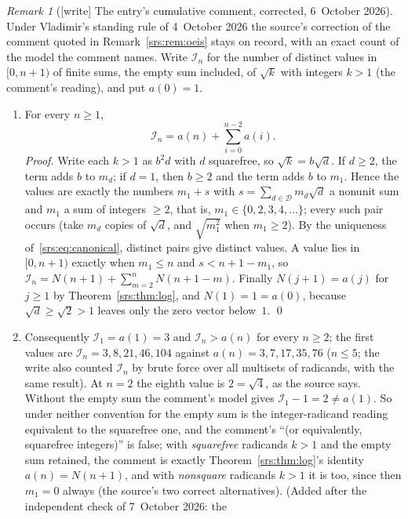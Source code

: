 \documentclass[11pt]{article}
\numberwithin{equation}{section}
\theoremstyle{remark}\newtheorem{remark}[theorem]{Remark}
\newcommand{\Sf}{\mathcal D}
\begin{document}
\begin{remark}[{[write]} The entry's cumulative comment, corrected, 6~October 2026]\label{srs:rem:comment}
Under Vladimir's standing rule of 4~October 2026 the source's correction of
the comment quoted in Remark~\ref{srs:rem:oeis} stays on record, with an
exact count of the model the comment names. Write $\mathcal I_n$ for the number
of distinct values in $[0,n+1)$ of finite sums, the empty sum included, of
$\sqrt k$ with integers $k>1$ (the comment's reading), and put $a(0)=1$.
\begin{enumerate}[label=(\alph*)]
\item For every $n\ge1$,
 \begin{equation}
  \mathcal I_n=a(n)+\sum_{i=0}^{n-2}a(i).\label{srs:eq:integermodel}
 \end{equation}
 \emph{Proof.} Write each $k>1$ as $b^2d$ with $d$ squarefree, so
 $\sqrt k=b\sqrt d$. If $d\ge2$, the term adds $b$ to $m_d$; if $d=1$, then
 $b\ge2$ and the term adds $b$ to $m_1$. Hence the values are exactly the
 numbers $m_1+s$ with $s=\sum_{d\in\Sf}m_d\sqrt d$ a nonunit sum and $m_1$ a
 sum of integers $\ge2$, that is, $m_1\in\{0,2,3,4,\dots\}$; every such pair
 occurs (take $m_d$ copies of $\sqrt d$, and $\sqrt{m_1^2}$ when $m_1\ge2$).
 By the uniqueness of~\eqref{srs:eq:canonical}, distinct pairs give distinct
 values. A value lies in $[0,n+1)$ exactly when $m_1\le n$ and $s<n+1-m_1$,
 so $\mathcal I_n=N(n+1)+\sum_{m=2}^{n}N(n+1-m)$. Finally $N(j+1)=a(j)$ for
 $j\ge1$ by Theorem~\ref{srs:thm:log}, and $N(1)=1=a(0)$, because
 $\sqrt d\ge\sqrt2>1$ leaves only the zero vector below~$1$. \qed
\item Consequently $\mathcal I_1=a(1)=3$ and $\mathcal I_n>a(n)$ for every
 $n\ge2$; the first values are $\mathcal I_n=3,8,21,46,104$ against
 $a(n)=3,7,17,35,76$ ($n\le5$; the write also counted $\mathcal I_n$ by brute
 force over all multisets of radicands, with the same result). At $n=2$ the
 eighth value is $2=\sqrt4$, as the source says. Without the empty sum the
 comment's model gives $\mathcal I_1-1=2\ne a(1)$. So under neither
 convention for the empty sum is the integer-radicand reading equivalent to
 the squarefree one, and the comment's ``(or equivalently, squarefree
 integers)'' is false; with \emph{squarefree} radicands $k>1$ and the empty
 sum retained, the comment is exactly Theorem~\ref{srs:thm:log}'s identity
 $a(n)=N(n+1)$, and with \emph{nonsquare} radicands $k>1$ it is too, since
 then $m_1=0$ always (the source's two correct alternatives).
 \textup{(Added after the independent check of 7~October 2026: the
}
\end{enumerate}
\end{remark}
\end{document}
